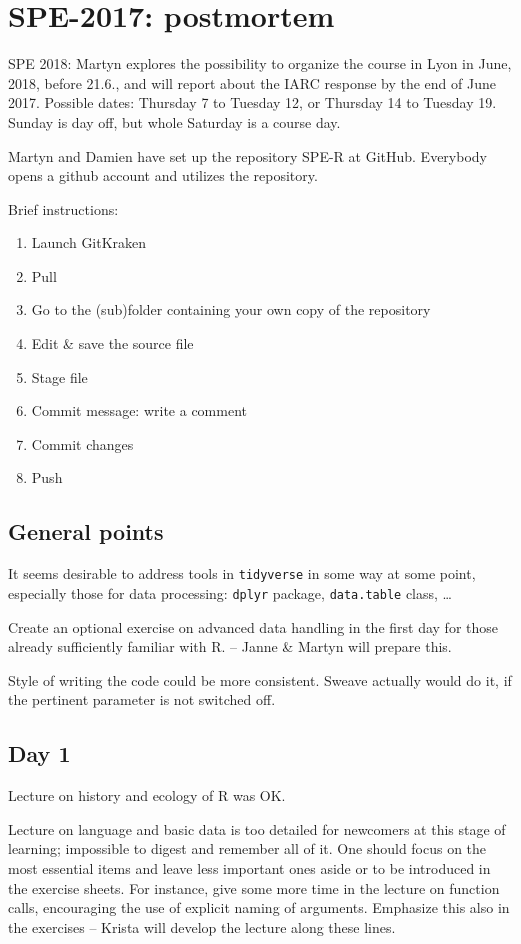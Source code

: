 \documentclass[11pt,a4]{article}
\begin{document}
\section*{SPE-2017: postmortem}

SPE 2018: Martyn explores the possibility to organize the course 
 in Lyon in June, 2018, before 21.6., and will report about the 
IARC response by the end of June 2017.
Possible dates: Thursday 7 to Tuesday 12, or Thursday 14 to Tuesday 19.
Sunday is day off, but whole Saturday is a course day. 
 
Martyn and Damien have set up the repository SPE-R at GitHub.
Everybody opens a github account and utilizes the repository.

Brief instructions:
\begin{enumerate}
\item Launch GitKraken
\item Pull
\item Go to the (sub)folder containing your own copy of the repository
\item Edit \& save the source file
\item Stage file
\item Commit message: write a comment
\item Commit changes
\item Push
\end{enumerate}

\subsection*{General points}

It seems desirable to address tools in {\tt tidyverse} in some way at some point, 
especially those for data processing:
 {\tt dplyr} package, {\tt data.table} class, \dots

Create an optional exercise on advanced data handling 
in the first day for those already sufficiently familiar with R.
 -- Janne \& Martyn will
prepare this.

Style of writing the code could be more consistent. Sweave actually would do it,
if the pertinent parameter is not switched off.  

\subsection*{Day 1}

Lecture on history and ecology of R was OK. 

Lecture on language and basic data 
is too detailed for newcomers at this stage of learning; 
impossible to digest and remember all of it. 
One should focus on the most essential items and leave less important ones aside or to be introduced in the exercise sheets.
For instance, give some more time in the lecture on function calls, encouraging the use
of explicit naming of arguments. Emphasize this also in the exercises -- Krista
will develop the lecture along these lines.
\end{document}
